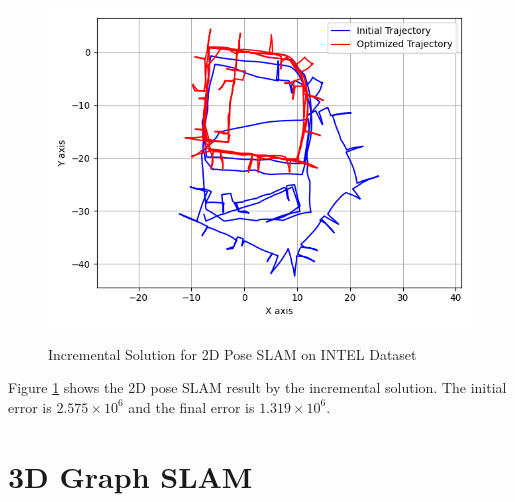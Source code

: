 \documentclass[11pt, oneside, letter]{article}
\begin{document}
\begin{enumerate}[A.]
\begin{figure}[H]
    \centering
        \textsf{\includegraphics[width=0.6\columnwidth]{../figures/solve_pose_slam_2d_incremental.png}}
        \caption{Incremental Solution for 2D Pose SLAM on INTEL Dataset}
        \label{fig:solve_pose_slam_2d_incremental}
\end{figure}

Figure \ref{fig:solve_pose_slam_2d_incremental} shows the 2D pose SLAM result by the incremental solution.
The initial error is $2.575\times 10^6$ and the final error is $1.319\times 10^6$.

\end{enumerate}



\section{3D Graph SLAM}\label{sec:3d}
\end{document}

